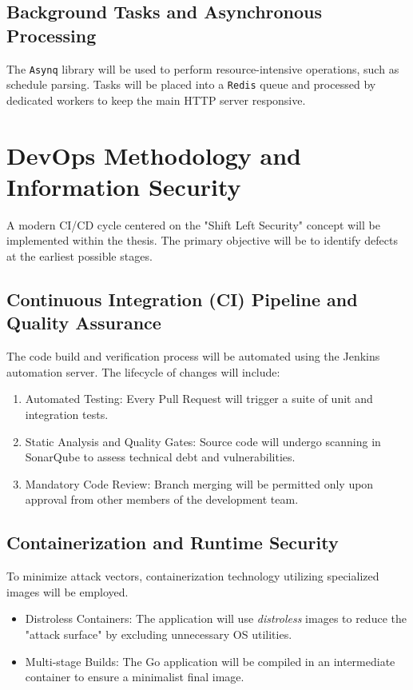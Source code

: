\documentclass[a4paper, 14pt]{extreport}
\begin{document}
\subsection{Background Tasks and Asynchronous Processing}
The \texttt{Asynq} library will be used to perform resource-intensive operations, such as schedule parsing. Tasks will be placed into a \texttt{Redis} queue and processed by dedicated workers to keep the main HTTP server responsive.

\section{DevOps Methodology and Information Security}
A modern CI/CD cycle centered on the "Shift Left Security" concept will be implemented within the thesis. The primary objective will be to identify defects at the earliest possible stages.

\subsection{Continuous Integration (CI) Pipeline and Quality Assurance}
The code build and verification process will be automated using the {Jenkins} automation server. The lifecycle of changes will include:
\begin{enumerate}
	\item {Automated Testing:} Every Pull Request will trigger a suite of unit and integration tests.
	\item {Static Analysis and Quality Gates:} Source code will undergo scanning in {SonarQube} to assess technical debt and vulnerabilities.
	\item {Mandatory Code Review:} Branch merging will be permitted only upon approval from other members of the development team.
\end{enumerate}

\subsection{Containerization and Runtime Security}
To minimize attack vectors, containerization technology utilizing specialized images will be employed.
\begin{itemize}
	\item {Distroless Containers:} The application will use \textit{distroless} images to reduce the "attack surface" by excluding unnecessary OS utilities.
	\item {Multi-stage Builds:} The Go application will be compiled in an intermediate container to ensure a minimalist final image.
\end{itemize}
\end{document}
